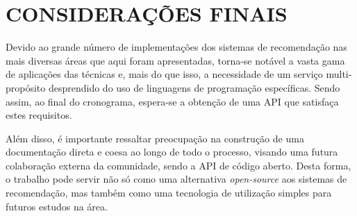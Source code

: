 \documentclass[12pt, openright, oneside, a4paper, brazil]{abntex2}
\begin{document}
\chapter{CONSIDERAÇÕES FINAIS}

Devido ao grande número de implementações dos sistemas de recomendação nas mais diversas áreas que aqui foram apresentadas, torna-se notável a vasta gama de aplicações das técnicas e, mais do que isso, a necessidade de um serviço multi-propósito desprendido do uso de linguagens de programação específicas. Sendo assim, ao final do cronograma, espera-se a obtenção de uma API que satisfaça estes requisitos.

Além disso, é importante ressaltar preocupação na construção de uma documentação direta e coesa ao longo de todo o processo, visando uma futura colaboração externa da comunidade, sendo a API de código aberto. Desta forma, o trabalho pode servir não só como uma alternativa \textit{open-source} aos sistemas de recomendação, mas também como uma tecnologia de utilização simples para futuros estudos na área.


\postextual

\end{document}
